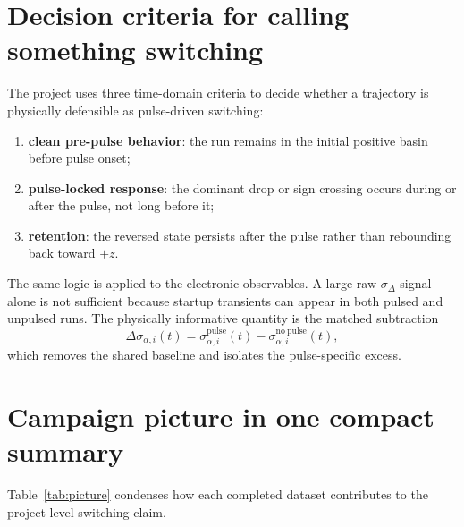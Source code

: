 \documentclass[11pt]{article}
\begin{document}
\section{Decision criteria for calling something switching}
The project uses three time-domain criteria to decide whether a trajectory is physically defensible as pulse-driven switching:
\begin{enumerate}
\item \textbf{clean pre-pulse behavior}: the run remains in the initial positive basin before pulse onset;
\item \textbf{pulse-locked response}: the dominant drop or sign crossing occurs during or after the pulse, not long before it;
\item \textbf{retention}: the reversed state persists after the pulse rather than rebounding back toward \(+z\).
\end{enumerate}

The same logic is applied to the electronic observables. A large raw \(\sigma_\Delta\) signal alone is not sufficient because startup transients can appear in both pulsed and unpulsed runs. The physically informative quantity is the matched subtraction
\[
\Delta \sigma_{\alpha,i}(t)=
\sigma^{\mathrm{pulse}}_{\alpha,i}(t)-\sigma^{\mathrm{no\ pulse}}_{\alpha,i}(t),
\]
which removes the shared baseline and isolates the pulse-specific excess.

\section{Campaign picture in one compact summary}
Table~\ref{tab:picture} condenses how each completed dataset contributes to the project-level switching claim.
\end{document}
